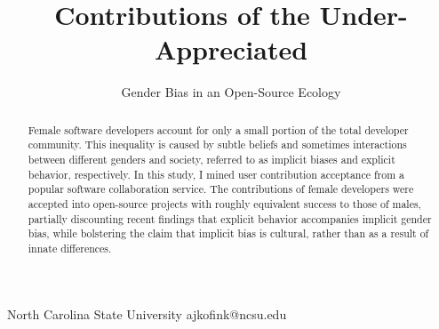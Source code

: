 \documentclass{sigplanconf}
\begin{document}
\setlength{\pdfpageheight}{\paperheight}
\setlength{\pdfpagewidth}{\paperwidth}






\title{Contributions of the Under-Appreciated}
\subtitle{Gender Bias in an Open-Source Ecology}

           {North Carolina State University}
           {ajkofink@ncsu.edu}

\maketitle

\begin{abstract}
  Female software developers account for only a small portion of the total
  developer community. This inequality is caused by subtle beliefs and 
  sometimes interactions between different genders and society,
  referred to as implicit biases and explicit behavior, respectively.
  In this study, I mined user contribution acceptance from a popular software collaboration
  service. The contributions of female developers
  were accepted into open-source projects with roughly equivalent success to
  those of males, partially discounting recent findings that explicit behavior
  accompanies implicit gender bias, while bolstering the claim that implicit bias is
  cultural, rather than as a result of innate differences.
\end{abstract}


\end{document}
